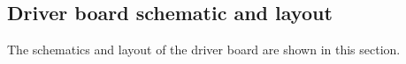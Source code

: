 \newpage
\begin{hugepage}
\section{Driver board schematic and layout}
\label{app:driver_board}
The schematics and layout of the driver board are shown in this section.\\

\pdfpagewidth
\begin{figure}
\centering


\end{figure}
\end{hugepage}
\newpage